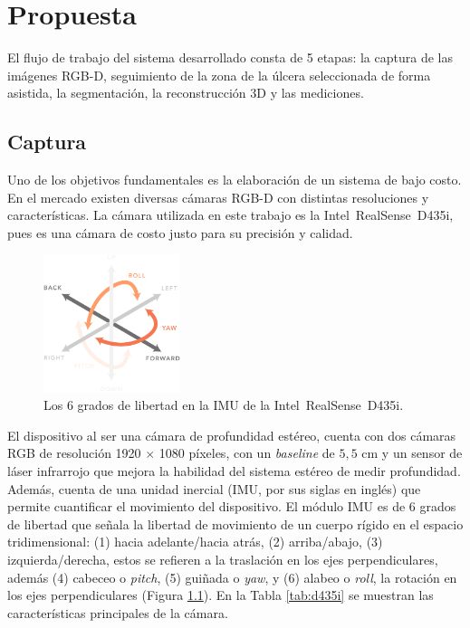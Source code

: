 \chapter{Propuesta}\label{chapter:proposal}

El flujo de trabajo del sistema desarrollado consta de 5 etapas: la captura de las imágenes RGB-D, seguimiento de la zona de la úlcera seleccionada de forma asistida, la segmentación, la reconstrucción 3D y las mediciones.

\section{Captura}

Uno de los objetivos fundamentales es la elaboración de un sistema de bajo costo. En el mercado existen diversas cámaras RGB-D con distintas resoluciones y características. La cámara utilizada en este trabajo es la Intel\textregistered~RealSense\texttrademark~D435i, pues es una cámara de costo justo para su precisión y calidad.

\begin{figure}[ht]
	\centering
	\includegraphics[width=4cm]{./Graphics/6dof.png}
	\caption{Los 6 grados de libertad en la IMU de la Intel\textregistered~RealSense\texttrademark~D435i.}
	\label{fig:6dof}
\end{figure}

El dispositivo al ser una cámara de profundidad estéreo, cuenta con dos cámaras RGB de resolución 1920 $\times$ 1080 píxeles, con un \textit{baseline} de $5,5$ cm y un sensor de láser infrarrojo que mejora la habilidad del sistema estéreo de medir profundidad. Además, cuenta de una unidad inercial (IMU, por sus siglas en inglés) que permite cuantificar el movimiento del dispositivo. El módulo IMU es de 6 grados de libertad que señala la libertad de movimiento de un cuerpo rígido en el espacio tridimensional: (1) hacia adelante/hacia atrás, (2) arriba/abajo, (3) izquierda/derecha, estos se refieren a la traslación en los ejes perpendiculares, además (4) cabeceo o \textit{pitch}, (5) guiñada o \textit{yaw}, y (6) alabeo o \textit{roll}, la rotación en los ejes perpendiculares (Figura \ref{fig:6dof}). En la Tabla \ref{tab:d435i} se muestran las características principales de la cámara.

